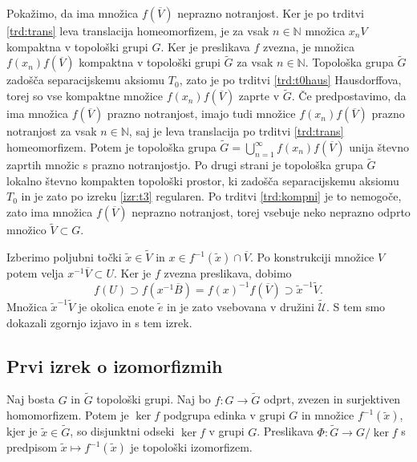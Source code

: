 \documentclass[mat1]{fmfdelo}
\newcommand{\N}{\mathbb N}
\newcommand{\Ucurl}{\mathcal{U}}
\newcommand{\closure}[1]{\overline{#1}}
\begin{document}
\begin{dokaz}
Pokažimo, da ima množica $f(\closure{V})$ neprazno notranjost. Ker je po trditvi \ref{trd:trans} leva translacija homeomorfizem, je za vsak $n \in \N$ množica $x_nV$ kompaktna v topološki grupi $G$. Ker je preslikava $f$ zvezna, je množica $f(x_n)f(\closure{V})$ kompaktna v topološki grupi $\widetilde{G}$ za vsak $n \in \N$. Topološka grupa $\widetilde{G}$ zadošča separacijskemu aksiomu $T_0$, zato je po trditvi \ref{trd:t0haus} Hausdorffova, torej so vse kompaktne množice $f(x_n)f(\closure{V})$ zaprte v $\widetilde{G}$. Če predpostavimo, da ima množica $f(\closure{V})$ prazno notranjost, imajo tudi množice $f(x_n)f(\closure{V})$ prazno notranjost za vsak $n \in \N$, saj je leva translacija po trditvi \ref{trd:trans} homeomorfizem. Potem je topološka grupa $\widetilde{G} = \bigcup_{n=1}^\infty f(x_n)f(\closure{V})$ unija števno zaprtih množic s prazno notranjostjo. Po drugi strani je topološka grupa $\widetilde{G}$ lokalno števno kompakten topološki prostor, ki zadošča separacijskemu aksiomu $T_0$ in je zato po izreku \ref{izr:t3} regularen. Po trditvi \ref{trd:kompni} je to nemogoče, zato ima množica $f(\closure{V})$ neprazno notranjost, torej vsebuje neko neprazno odprto množico $\widetilde{V} \subset G$.

Izberimo poljubni točki $\tilde{x} \in \widetilde{V}$ in $x \in f^{-1}(\tilde{x})\cap\closure{V}$.
Po konstrukciji množice $V$ potem velja $x^{-1}\closure{V} \subset U$. Ker je $f$ zvezna preslikava, dobimo
\[ f(U) \supset f(x^{-1}\closure{B}) = f(x)^{-1}f(\closure{V}) \supset \tilde{x}^{-1}\widetilde{V}. \]
Množica $\tilde{x}^{-1}\widetilde{V}$ je okolica enote $\tilde{e}$ in je zato vsebovana v družini $\widetilde{\Ucurl}$. S tem smo dokazali zgornjo izjavo in s tem izrek.
\end{dokaz}

\subsection{Prvi izrek o izomorfizmih}
\begin{izrek}\label{izr:prvitopizrek}
Naj bosta $G$ in $\widetilde{G}$ topološki grupi. Naj bo $f\colon G \to \widetilde{G}$ odprt, zvezen in surjektiven homomorfizem. Potem je $\ker f$ podgrupa edinka v grupi $G$ in množice $f^{-1}(\tilde{x})$, kjer je $\tilde{x} \in \widetilde{G}$, so disjunktni odseki $\ker f$ v grupi $G$. Preslikava $\Phi\colon\widetilde{G} \to G/\ker f$ s predpisom $\tilde{x} \mapsto f^{-1}(\tilde{x})$ je topološki izomorfizem.
\end{izrek}
\end{document}
